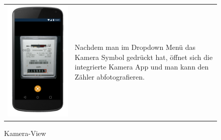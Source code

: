 \begin{figure}[h]
\begin{tabularx}{\textwidth}{X  X}
	\includegraphics[scale = 0.155]{img/AndroidMockup/SystemCamera} \caption{Kamera-View}  & Nachdem man im Dropdown Menü das Kamera Symbol gedrückt hat, öffnet sich die integrierte Kamera App und man kann den Zähler abfotografieren.  \\ 
\end{tabularx}
\end{figure}

